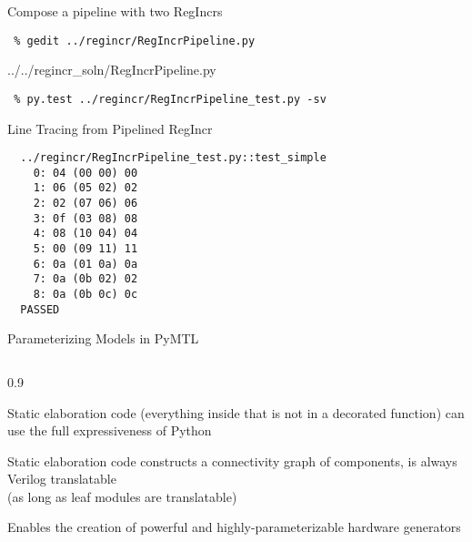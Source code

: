 \begin{task}\begin{frame}[fragile]{Compose a pipeline with two RegIncrs}

\vspace{-0.15in}
\begin{Verbatim}[commandchars=\\\{\}]
 % cd    \midtilde/pymtl-tut/build
 % gedit ../regincr/RegIncrPipeline.py
\end{Verbatim}
\vspace{-0.17in}

%
{../../regincr_soln/RegIncrPipeline.py}

\vspace{-0.2in}
\begin{Verbatim}
 % py.test ../regincr/RegIncrPipeline_test.py -sv
\end{Verbatim}

\end{frame}
\end{task}

\begin{frame}[fragile]{Line Tracing from Pipelined RegIncr}

\begin{Verbatim}
  ../regincr/RegIncrPipeline_test.py::test_simple
    0: 04 (00 00) 00
    1: 06 (05 02) 02
    2: 02 (07 06) 06
    3: 0f (03 08) 08
    4: 08 (10 04) 04
    5: 00 (09 11) 11
    6: 0a (01 0a) 0a
    7: 0a (0b 02) 02
    8: 0a (0b 0c) 0c
  PASSED
\end{Verbatim}

\end{frame}

\begin{frame}{Parameterizing Models in PyMTL}

\medskip
\begin{cbxcols}
\begin{column}{0.9\tw}
\begin{cbxlist}

  \1 Static elaboration code (everything inside  that is
     not in a decorated function) can use the full expressiveness of
     Python

  \1 Static elaboration code constructs a connectivity graph of
     components, is always Verilog translatable \\
     (as long as leaf modules are translatable)

  \1 Enables the creation of powerful and highly-parameterizable
     hardware generators

\end{cbxlist}
\end{column}
\end{cbxcols}
\end{frame}

